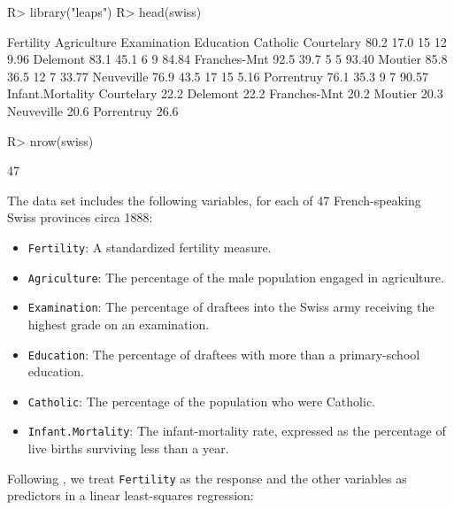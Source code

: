\documentclass[
]{jss}
\providecommand{\tightlist}{%
  \setlength{\itemsep}{0pt}\setlength{\parskip}{0pt}}
\begin{document}
\begin{CodeChunk}
\begin{CodeInput}
R> library("leaps")
R> head(swiss)
\end{CodeInput}
\begin{CodeOutput}
             Fertility Agriculture Examination Education Catholic
Courtelary        80.2        17.0          15        12     9.96
Delemont          83.1        45.1           6         9    84.84
Franches-Mnt      92.5        39.7           5         5    93.40
Moutier           85.8        36.5          12         7    33.77
Neuveville        76.9        43.5          17        15     5.16
Porrentruy        76.1        35.3           9         7    90.57
             Infant.Mortality
Courtelary               22.2
Delemont                 22.2
Franches-Mnt             20.2
Moutier                  20.3
Neuveville               20.6
Porrentruy               26.6
\end{CodeOutput}
\begin{CodeInput}
R> nrow(swiss)
\end{CodeInput}
\begin{CodeOutput}
[1] 47
\end{CodeOutput}
\end{CodeChunk}

The data set includes the following variables, for each of 47
French-speaking Swiss provinces circa 1888:

\begin{itemize}
\tightlist
\item
  \texttt{Fertility}: A standardized fertility measure.
\item
  \texttt{Agriculture}: The percentage of the male population engaged in
  agriculture.
\item
  \texttt{Examination}: The percentage of draftees into the Swiss army
  receiving the highest grade on an examination.
\item
  \texttt{Education}: The percentage of draftees with more than a
  primary-school education.
\item
  \texttt{Catholic}: The percentage of the population who were Catholic.
\item
  \texttt{Infant.Mortality}: The infant-mortality rate, expressed as the
  percentage of live births surviving less than a year.
\end{itemize}

Following \citet{LumleyMiller:2020}, we treat \texttt{Fertility} as the
response and the other variables as predictors in a linear least-squares
regression:
\end{document}

